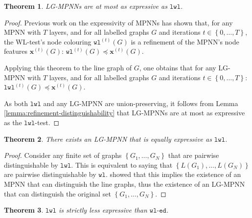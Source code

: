 \documentclass{article}
\newtheorem{theorem}{Theorem}
\newcommand{\set}[1]{\left\{#1\right\}}
\newcommand{\iter}[1]{^{(#1)}}
\newcommand{\wl}{\texttt{wl}}
\newcommand{\wledge}{\texttt{wl-ed}}
\newcommand{\lwl}{\texttt{lwl}}
\newcommand{\bs}[1]{\boldsymbol{#1}}
\newcommand{\feat}{\bs{x}}
\begin{document}
\begin{theorem} \label{thm:lg-mpnn-less-than-lwl}
    LG-MPNNs are at most as expressive as $\lwl$. 
\end{theorem}
\begin{proof}
    Previous work on the expressivity of MPNNs \cite{morris2019weisfeiler} has shown that, for any MPNN with $T$ layers, and for all labelled graphs $G$ and iterations $t\in\set{0,\dots,T}$, the WL-test's node colouring $\wl\iter{t}(G)$ is a refinement of the MPNN's node features $\feat\iter{t}(G)$:
    $\wl\iter{t}(G) \preceq \feat\iter{t}(G)$.

    Applying this theorem to the line graph of $G$, one obtains that for any LG-MPNN with $T$ layers, and for all labelled graphs $G$ and iterations $t\in\set{0,\dots,T}$:
    $\lwl\iter{t}(G) \preceq \feat\iter{t}(G)$.

    As both $\lwl$ and any LG-MPNN are union-preserving, it follows from Lemma \ref{lemma:refinement-distinguishability} that LG-MPNNs are at most as expressive as the $\lwl$-test.
\end{proof}

\begin{theorem} \label{thm:lg-mpnn-equal-to-lwl}
    There exists an LG-MPNN that is equally expressive as $\lwl$.
\end{theorem}
\begin{proof}
    Consider any finite set of graphs $\set{G_1, \dots, G_N}$ that are pairwise distinguishable by $\lwl$. This is equivalent to saying that $\set{L(G_1), \dots, L(G_N)}$ are pairwise distinguishable by $\wl$. \cite{xu2018powerful} showed that this implies the existence of an MPNN that can distinguish the line graphs, thus the existence of an LG-MPNN that can distinguish the original set $\set{G_1, \dots, G_N}$.
\end{proof}

\begin{theorem} \label{thm:lwl-less-than-wledge}
    $\lwl$ is strictly less expressive than $\wledge$.
\end{theorem}
\newlength{\WLOGarrowwidth}
\newcommand{\RightarrowAsWideAsWLOGArrow}{\makebox[\WLOGarrowwidth][c]{$\Rightarrow$}}
\end{document}
